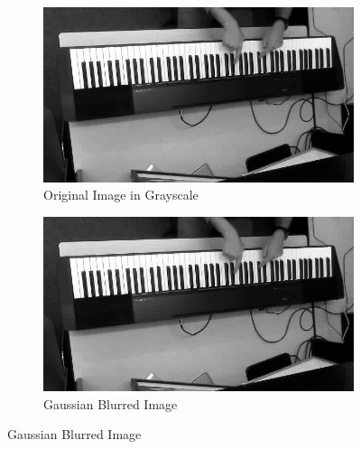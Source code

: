 \documentclass[10pt,twocolumn,letterpaper]{article}
\begin{document}
\begin{figure}[h!]
  \begin{subfigure}{0.24\textwidth}
  \includegraphics[width=\linewidth]{fig/1.jpg}
  \caption{Original Image in Grayscale} \label{fig:a}
  \end{subfigure}\hspace*{\fill}
  \begin{subfigure}{0.24\textwidth}
  \includegraphics[width=\linewidth]{fig/2.jpg}
  \caption{Gaussian Blurred Image} \label{fig:b}
  \end{subfigure}


\end{figure}
\end{document}
